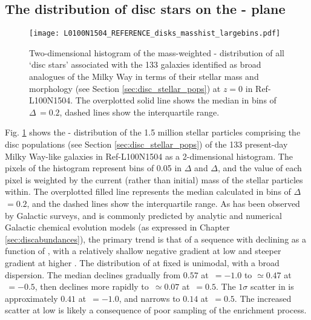 \subsection{The distribution of disc stars on the \afe{}-\feh{} plane}
\label{sec:stacked_afe_feh}

\begin{figure}
\texttt{[image: L0100N1504\_REFERENCE\_disks\_masshist\_largebins.pdf]}
\caption[The mass weighted \afe{}-\feh{} distribution of stacked `disc stars' inside Milky Way mass galaxies in the Ref-L100N1504 simulation]{\label{fig:afestack} Two-dimensional histogram of the mass-weighted \afe{}-\feh{} distribution of all `disc stars' associated with the 133 galaxies identified as broad analogues of the Milky Way in terms of their stellar mass and morphology (see Section \ref{sec:disc_stellar_pops}) at $z=0$ in Ref-L100N1504. The overplotted solid line shows the median \afe{} in bins of $\Delta$\feh{}\,$=0.2$, dashed lines show the interquartile range.}
\end{figure}

Fig. \ref{fig:afestack} shows the \afe{}-\feh{} distribution of the 1.5 million stellar particles comprising the disc populations (see Section \ref{sec:disc_stellar_pops}) of the 133 present-day Milky Way-like galaxies in Ref-L100N1504 as a 2-dimensional histogram. The pixels of the histogram represent bins of 0.05 in $\Delta$\afe{} and $\Delta$\feh{}, and the value of each pixel is weighted by the current (rather than initial) mass of the stellar particles within. The overplotted filled line represents the median \afe{} calculated in bins of $\Delta$\feh{}$=0.2$, and the dashed lines show the interquartile range. As has been observed by Galactic surveys, and is commonly predicted by analytic and numerical Galactic chemical evolution models (as expressed in Chapter \ref{sec:discabundances}), the primary trend is that of a sequence with declining \afe{} as a function of \feh{}, with a relatively shallow negative gradient at low \feh{} and steeper gradient at higher \feh{}. The distribution of \afe{} at fixed \feh{} is unimodal, with a broad dispersion. The median \afe{} declines gradually from $0.57$ at \feh{}$\,=-1.0$ to $\simeq 0.47$ at \feh{}$\,=-0.5$, then declines more rapidly to \afe{}$\,\simeq 0.07$ at \feh{}$\,=0.5$. The $1\sigma$ scatter in \afe{} is approximately $0.41$ at \feh{}$\,=-1.0$, and narrows to $0.14$ at \feh{}$\,=0.5$. The increased scatter at low \feh{} is likely a consequence of poor sampling of the enrichment process.

